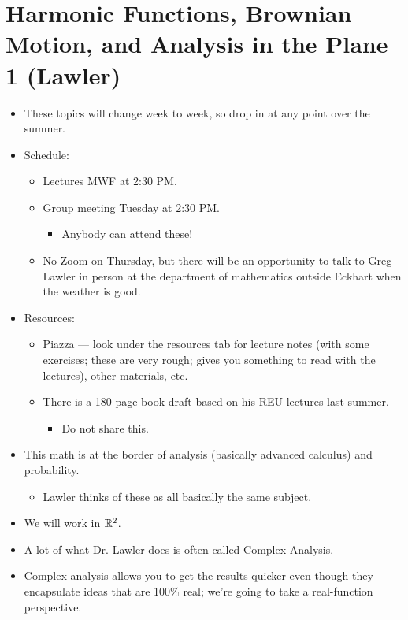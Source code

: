 \documentclass[../apprentice.tex]{subfiles}
\begin{document}
\section{Harmonic Functions, Brownian Motion, and Analysis in the Plane 1 (Lawler)}
\begin{itemize}
    \item These topics will change week to week, so drop in at any point over the summer.
    \item Schedule:
    \begin{itemize}
        \item Lectures MWF at 2:30 PM.
        \item Group meeting Tuesday at 2:30 PM.
        \begin{itemize}
            \item Anybody can attend these!
        \end{itemize}
        \item No Zoom on Thursday, but there will be an opportunity to talk to Greg Lawler in person at the department of mathematics outside Eckhart when the weather is good.
    \end{itemize}
    \item Resources:
    \begin{itemize}
        \item Piazza --- look under the resources tab for lecture notes (with some exercises; these are very rough; gives you something to read with the lectures), other materials, etc.
        \item There is a 180 page book draft based on his REU lectures last summer.
        \begin{itemize}
            \item Do not share this.
        \end{itemize}
    \end{itemize}
    \item This math is at the border of analysis (basically advanced calculus) and probability.
    \begin{itemize}
        \item Lawler thinks of these as all basically the same subject.
    \end{itemize}
    \item We will work in $\mathbb{R}^2$.
    \item A lot of what Dr. Lawler does is often called Complex Analysis.
    \item Complex analysis allows you to get the results quicker even though they encapsulate ideas that are 100\% real; we're going to take a real-function perspective.

\end{itemize}
\end{document}
